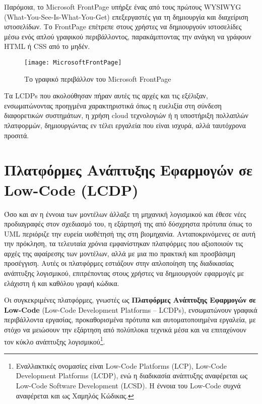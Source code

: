             Παρόμοια, το Microsoft FrontPage υπήρξε ένας από τους πρώτους WYSIWYG (What-You-See-Is-What-You-Get) επεξεργαστές για τη δημιουργία και διαχείριση ιστοσελίδων. Το FrontPage επέτρεπε στους χρήστες να δημιουργούν ιστοσελίδες μέσω ενός απλού γραφικού περιβάλλοντος, παρακάμπτοντας την ανάγκη να γράφουν HTML ή CSS από το μηδέν.

            \begin{figure}[h!] \noindent \centering
                    \texttt{[image: MicrosoftFrontPage]}
                    \caption{\centering Το γραφικό περιβάλλον του Microsoft FrontPage}
            \end{figure}

            Τα LCDPs που ακολούθησαν πήραν αυτές τις αρχές και τις εξέλιξαν, ενσωματώνοντας προηγμένα χαρακτηριστικά όπως η ευελιξία στη σύνδεση διαφορετικών συστημάτων, η χρήση cloud τεχνολογιών ή η υποστήριξη πολλαπλών πλατφορμών, δημιουργώντας εν τέλει εργαλεία που είναι ισχυρά, αλλά ταυτόχρονα προσιτά. \cite{LowCodeSimon}


    \section{Πλατφόρμες Ανάπτυξης Εφαρμογών σε Low-Code (LCDP)} \label{sec:LCDP}
        Όσο και αν η έννοια των μοντέλων άλλαξε τη μηχανική λογισμικού και έθεσε νέες προδιαγραφές στον σχεδιασμό του, η εξάρτησή της από δύσχρηστα πρότυπα όπως το UML περιόριζε την ευρεία υιοθέτησή της στη βιομηχανία. Ανταποκρινόμενες σε αυτή την πρόκληση, τα τελευταία χρόνια εμφανίστηκαν πλατφόρμες που αξιοποιούν τις αρχές της αφαίρεσης των μοντέλων, αλλά με μια πιο πρακτική και προσβάσιμη προσέγγιση. Αυτές οι πλατφόρμες εστιάζουν στην απλοποίηση της διαδικασίας ανάπτυξης λογισμικού, επιτρέποντας στους χρήστες να δημιουργούν εφαρμογές με ελάχιστη ή και καθόλου γραφή κώδικα.

        Οι συγκεκριμένες πλατφόρμες, γνωστές ως \textbf{Πλατφόρμες Ανάπτυξης Εφαρμογών σε Low-Code} (Low-Code Development Platforms -- LCDPs), ενσωματώνουν γραφικά περιβάλλοντα εργασίας, προκαθορισμένα πρότυπα και αυτοματοποιημένα εργαλεία, με στόχο να μειώσουν την εξάρτηση από πολύπλοκα τεχνικά μέσα και να επιταχύνουν τον κύκλο ανάπτυξης λογισμικού\footnote{Εναλλακτικές ονομασίες είναι Low-Code Platforms (LCP), Low-Code Development Platforms (LCDP), ενώ η διαδικασία ανάπτυξης αναφέρεται ως Low-Code Software Development (LCSD). Η έννοια του Low-Code συχνά αναφέρεται και ως Χαμηλός Κώδικας.}.\cite{Bock2021}

